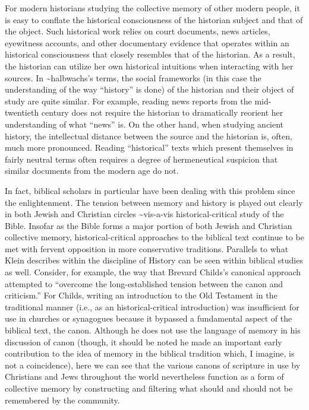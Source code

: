For modern historians studying the collective memory of other modern
people, it is easy to conflate the historical consciousness of the
historian subject and that of the object. Such historical work relies on
court documents, news articles, eyewitness accounts, and other
documentary evidence that operates within an historical consciousness
that closely resembles that of the historian. As a result, the historian
can utilize her own historical intuitions when interacting with her
sources. In \textasciitilde{}halbwachs's terms, the social frameworks
(in this case the understanding of the way ``history'' is done) of the
historian and their object of study are quite similar. For example,
reading news reports from the mid-twentieth century does not require the
historian to dramatically reorient her understanding of what ``news''
is. On the other hand, when studying ancient history, the intellectual
distance between the source and the historian is, often, much more
pronounced. Reading ``historical'' texts which present themselves in
fairly neutral terms often requires a degree of hermeneutical suspicion
that similar documents from the modern age do not.

In fact, biblical scholars in particular have been dealing with this
problem since the enlightenment. The tension between memory and history
is played out clearly in both Jewish and Christian circles
\textasciitilde{}vis-a-vis historical-critical study of the Bible.
Insofar as the Bible forms a major portion of both Jewish and Christian
collective memory, historical-critical approaches to the biblical text
continue to be met with fervent opposition in more conservative
traditions. Parallels to what Klein describes within the discipline of
History can be seen within biblical studies as well. Consider, for
example, the way that Brevard Childs's canonical approach attempted to
``overcome the long-established tension between the canon and
criticism.''\autocite[45]{childs1979} For Childs, writing an
introduction to the Old Testament in the traditional manner (i.e., as an
historical-critical introduction) was insufficient for use in churches
or synagogues because it bypassed a fundamental aspect of the biblical
text, the canon. Although he does not use the language of memory in his
discussion of canon (though, it should be noted he made an important
early contribution to the idea of memory in the biblical tradition
which, I imagine, is not a coincidence\autocite{childs1962}), here we
can see that the various canons of scripture in use by Christians and
Jews throughout the world nevertheless function as a form of collective
memory by constructing and filtering what should and should not be
remembered by the community.

